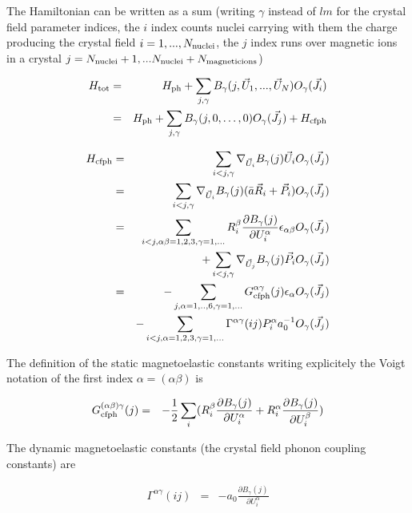 The Hamiltonian can be written as a sum  (writing $\gamma$ instead of $lm$ for the crystal field parameter
indices, the $i$ index counts nuclei carrying with them
the charge producing the crystal field $i=1,...,N_{\rm nuclei}$, 
the $j$ index runs over magnetic ions in a crystal $j=N_{\rm nuclei}+1,... N_{\rm nuclei}+N_{\rm magnetic ions}$)

\begin{eqnarray}\label{Hamiltonian}
H_{\rm tot} & = & H_{\rm ph} +\sum_{j,\gamma} B_{\gamma}(j,\vec U_1,...,\vec U_N) O_{\gamma}(\vec J_i) \\
&=& H_{\rm ph} +\sum_{j,\gamma} B_{\gamma}(j,0,\dots,0) O_{\gamma}(\vec J_j) + H_{\rm cfph}\nonumber 
 \end{eqnarray}

\begin{eqnarray}\label{Hcfph}
H_{\rm cfph}&=&\sum_{i<j,\gamma}\nabla_{\vec U_i} B_{\gamma}(j) \vec U_i O_{\gamma}(\vec J_j) \nonumber \\
&=& \sum_{i<j,\gamma}\nabla_{\vec U_i} B_{\gamma}(j) (\bar a \vec R_i + \vec P_i)O_{\gamma}(\vec J_j) \nonumber \\
&=& \sum_{i<j,\alpha\beta=1,2,3,\gamma=1,...} R_i^{\beta}  \frac{\partial B_{\gamma}(j)}{\partial U_i^{\alpha}}  
  \epsilon_{\alpha\beta} O_{\gamma}(\vec J_j) \nonumber \\
 &&+\sum_{i<j,\gamma}\nabla_{\vec U_j} B_{\gamma}(j) \vec P_i O_{\gamma}(\vec J_j) \nonumber \\
&=& -\sum_{j,\alpha=1,..,6,\gamma=1,...} G_{\rm cfph}^{\alpha\gamma}(j) \epsilon_{\alpha} O_{\gamma}(\vec J_j) \nonumber \\
 &&-\sum_{i<j,\alpha=1,2,3,\gamma=1,...} \Gamma^{\alpha\gamma}(ij) P_i^{\alpha}a_0^{-1} O_{\gamma}(\vec J_j)
 \end{eqnarray}

The definition of the static magnetoelastic constants writing explicitely the Voigt notation of the first index $\alpha=(\alpha\beta)$
 is

\begin{eqnarray}\label{Gcfph}
 G_{\rm cfph}^{(\alpha\beta)\gamma}(j) &=&
-\frac{1}{2}\sum_{i}( R_i^{\beta}  \frac{\partial B_{\gamma}(j)}{\partial U_i^{\alpha}} 
+ R_i^{\alpha} \frac{\partial B_{\gamma}(j)}{\partial U_i^{\beta}} ) 
 \end{eqnarray}

The dynamic magnetoelastic constants (the crystal field phonon coupling constants) are

\begin{eqnarray}\label{Gammacfph}
\Gamma^{\alpha\gamma}(ij)&=& -a_0\frac{\partial B_{\gamma}(j)}{\partial U_i^{\alpha}}
 \end{eqnarray}

